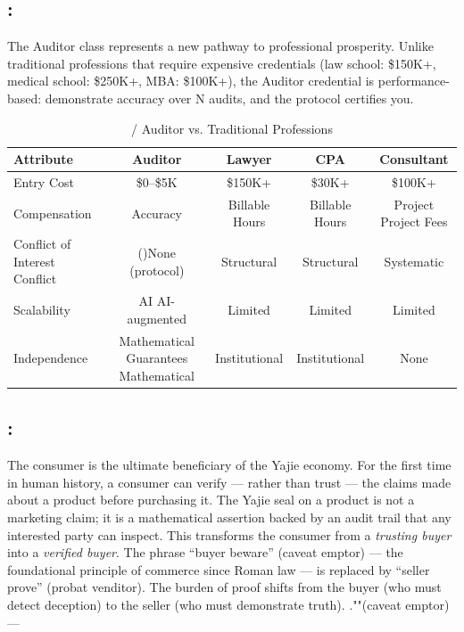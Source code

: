 \documentclass[12pt,a4paper]{article}
\theoremstyle{remark}
\begin{document}
\subsection{:}
The Auditor class represents a new pathway to professional prosperity. Unlike traditional 
professions that require expensive credentials (law school: \$150K+, medical school: 
\$250K+, MBA: \$100K+), the Auditor credential is performance-based: demonstrate accuracy 
over N audits, and the protocol certifies you.
\begin{table}[H]
\centering
\caption{ / Auditor vs. Traditional Professions}
\label{tab:profession_compare}
\begin{tabular}{@{}lcccc@{}}
\toprule
\textbf{ Attribute} & \textbf{ Auditor} & \textbf{ Lawyer} & \textbf{ CPA} & \textbf{ Consultant} \\
\midrule
 Entry Cost & \$0--\$5K & \$150K+ & \$30K+ & \$100K+ \\
 Compensation & Accuracy & Billable Hours & Billable Hours & Project Project Fees \\
Conflict of Interest Conflict & ()None (protocol) & Structural & Structural & Systematic \\
 Scalability & AI AI-augmented & Limited & Limited & Limited \\
 Independence & Mathematical Guarantees Mathematical & Institutional & Institutional & None \\
\bottomrule
\end{tabular}
\end{table}
\subsection{:}
The consumer is the ultimate beneficiary of the Yajie economy. For the first time in 
human history, a consumer can verify --- rather than trust --- the claims made about a product 
before purchasing it. The Yajie seal on a product is not a marketing claim; it is a 
mathematical assertion backed by an audit trail that any interested party can inspect.
This transforms the consumer from a \textit{trusting buyer} into a \textit{verified buyer}. 
The phrase ``buyer beware'' (caveat emptor) --- the foundational principle of commerce since 
Roman law --- is replaced by ``seller prove'' (probat venditor). The burden of proof shifts 
from the buyer (who must detect deception) to the seller (who must demonstrate truth).
\medskip
\textit{}\textit{}.""(caveat emptor)---
\end{document}
